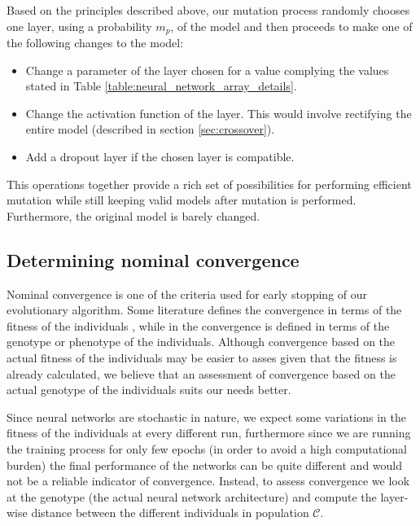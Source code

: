 \documentclass[journal]{IEEEtran}
\begin{document}
Based on the principles described above, our mutation process randomly chooses one layer, using a probability $m_p$, of the model and then proceeds to make one of the following changes to the model:

\begin{itemize}
\item Change a parameter of the layer chosen for a value complying the values stated in Table \ref{table:neural_network_array_details}.
\item Change the activation function of the layer. This would involve rectifying the entire model (described in section \ref{sec:crossover}).
\item Add a dropout layer if the chosen layer is compatible.\\
\end{itemize} 

This operations together provide a rich set of possibilities for performing efficient mutation while still keeping valid models after mutation is performed. Furthermore, the original model is barely changed.

\subsection{Determining nominal convergence}
\label{sec:convergence}

Nominal convergence is one of the criteria used for early stopping of our evolutionary algorithm. Some literature defines the convergence in terms of the fitness of the individuals \cite{Engelbrecht2007}, while in \cite{Krishnakumar1989} the convergence is defined in terms of the genotype or phenotype of the individuals. Although convergence based on the actual fitness of the individuals may be easier to asses given that the fitness is already calculated, we believe that an assessment of convergence based on the actual genotype of the individuals suits our needs better.

Since neural networks are stochastic in nature, we expect some variations in the fitness of the individuals at every different run, furthermore since we are running the training process for only few epochs (in order to avoid a high computational burden) the final performance of the networks can be quite different and would not be a reliable indicator of convergence. Instead, to assess convergence we look at the genotype (the actual neural network architecture) and compute the layer-wise distance between the different individuals in population $\mathcal{C}$.
\end{document}
